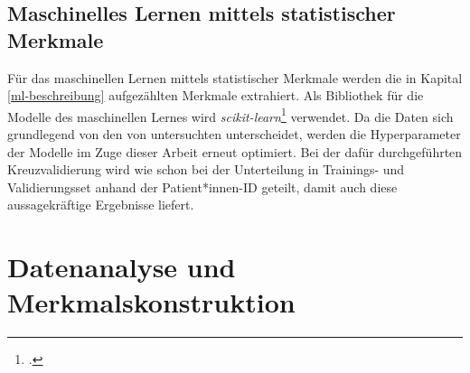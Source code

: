 \subsection{Maschinelles Lernen mittels statistischer Merkmale}

Für das maschinellen Lernen mittels statistischer Merkmale werden die in Kapital \ref{ml-beschreibung} aufgezählten Merkmale extrahiert. Als Bibliothek für die Modelle des maschinellen Lernes wird \textit{scikit-learn}\footcite[]{scikit-learn} verwendet. Da die Daten sich grundlegend von den von \citeauthor{Sadek2016} untersuchten unterscheidet, werden die Hyperparameter der Modelle im Zuge dieser Arbeit erneut optimiert. Bei der dafür durchgeführten Kreuzvalidierung wird wie schon bei der Unterteilung in Trainings- und Validierungsset anhand der Patient*innen-ID geteilt, damit auch diese aussagekräftige Ergebnisse liefert.

\section{Datenanalyse und Merkmalskonstruktion}



